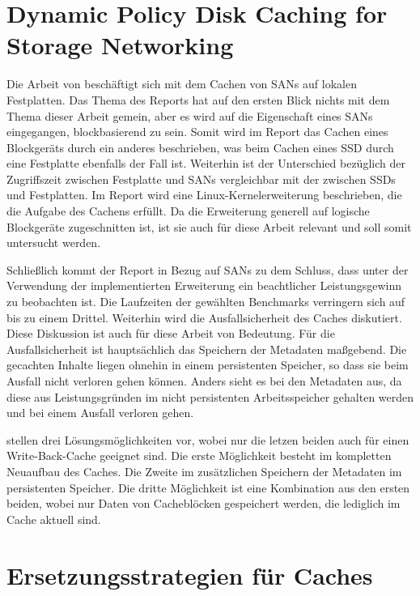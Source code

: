 \section{Dynamic Policy Disk Caching for Storage Networking}
\label{chap3:dm-cache}

Die Arbeit von \textcite{dm-cache} beschäftigt sich mit dem Cachen von \acp{SAN} auf lokalen Festplatten. Das Thema des Reports hat auf den ersten Blick nichts mit dem
Thema dieser Arbeit gemein, aber es wird auf die Eigenschaft eines \ac{SAN}s eingegangen, blockbasierend zu sein. Somit wird im Report das Cachen eines
Blockgeräts durch ein anderes beschrieben, was beim Cachen eines \ac{SSD} durch eine Festplatte ebenfalls der Fall ist. Weiterhin ist der Unterschied bezüglich der Zugriffszeit
zwischen Festplatte und \acp{SAN} vergleichbar mit der zwischen \acp{SSD} und Festplatten. Im Report wird eine Linux-Kernelerweiterung beschrieben, die die
Aufgabe des Cachens erfüllt. Da die Erweiterung generell auf logische Blockgeräte zugeschnitten ist, ist sie auch für diese Arbeit relevant und soll somit untersucht
werden.

Schließlich kommt der Report in Bezug auf \acp{SAN} zu dem Schluss, dass unter der Verwendung der implementierten Erweiterung ein beachtlicher Leistungsgewinn
zu beobachten ist. Die Laufzeiten der gewählten Benchmarks verringern sich auf bis zu einem Drittel. Weiterhin wird die Ausfallsicherheit des Caches diskutiert.
Diese Diskussion ist auch für diese Arbeit von Bedeutung. Für die Ausfallsicherheit ist hauptsächlich das Speichern der Metadaten maßgebend. Die gecachten
Inhalte liegen ohnehin in einem persistenten Speicher, so dass sie beim Ausfall nicht verloren gehen können. Anders sieht es bei den Metadaten aus, da diese aus
Leistungsgründen im nicht persistenten Arbeitsspeicher gehalten werden und bei einem Ausfall verloren gehen.

 stellen drei Lösungsmöglichkeiten vor, wobei nur die letzen beiden auch für einen Write-Back-Cache geeignet sind. Die erste Möglichkeit
besteht im kompletten Neuaufbau des Caches. Die Zweite im zusätzlichen Speichern der Metadaten im persistenten Speicher. Die dritte Möglichkeit ist eine
Kombination aus den ersten beiden, wobei nur Daten von Cacheblöcken gespeichert werden, die lediglich im Cache aktuell sind.

\section{Ersetzungsstrategien für Caches}
\label{chap3:ersetzen}

